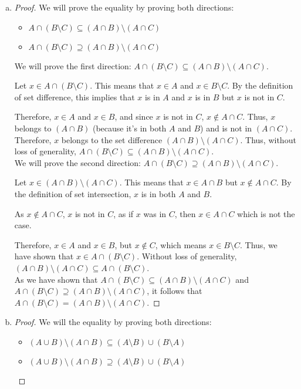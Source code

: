 \documentclass[11pt]{scrartcl}
\theoremstyle{dotlessP}
\theoremstyle{dotlessN}
\newcommand{\unite}{\cup}
\newcommand{\inter}{\cap}
\newcommand{\smin}{\setminus}
\begin{document}
\begin{enumerate}[a)]
	\item 
		\begin{proof}
			We will prove the equality by proving both directions:
			\begin{itemize}
				\item  $A \inter (B \setminus C) \subseteq (A \inter B) \setminus (A \inter C)$
				\item $A \inter (B \setminus C) \supseteq (A \inter B) \setminus (A \inter C)$
			\end{itemize}

			We will prove the first direction: $A \inter (B \setminus C) \subseteq (A \inter B) \setminus (A \inter C)$.

			Let $x \in A \cap (B \setminus C)$. This means that $x \in A$ and $x \in B \setminus C$. By the definition of set difference, this implies that $x$ is in $A$ and $x$ is in $B$ but $x$ is not in $C$.

Therefore, $x \in A$ and $x \in B$, and since $x$ is not in $C$, $x \notin A \cap C$. Thus, $x$ belongs to $(A \cap B)$ (because it's in both $A$ and $B$) and is not in $(A \cap C)$. Therefore, $x$ belongs to the set difference $(A \cap B) \setminus (A \cap C)$. Thus, without loss of generality, $A \inter (B \smin C) \subseteq (A \inter B) \smin (A \inter C)$.
\\

We will prove the second direction: $A \inter (B \setminus C) \supseteq (A \inter B) \setminus (A \inter C)$.

Let $x \in (A \cap B) \setminus (A \cap C)$. This means that $x \in A \cap B$ but $x \not\in A \cap C$. By the definition of set intersection, $x$ is in both $A$ and $B$.

As $x \not\in A \inter C$, $x$ is not in $C$, as if $x$ was in $C$, then $x \in A \inter C$ which is not the case. 

Therefore, $x \in A$ and $x \in B$, but $x \not\in C$, which means $x \in B \setminus C$. Thus, we have shown that $x \in A \cap (B \setminus C)$. Without loss of generality, $(A \inter B) \smin (A \inter C) \subseteq A \inter (B \smin C)$.
\\

As we have shown that $A \inter (B \setminus C) \subseteq (A \inter B) \setminus (A \inter C)$ and $A \inter (B \setminus C) \supseteq (A \inter B) \setminus (A \inter C)$, it follows that $A \inter (B \setminus C) = (A \inter B) \setminus (A \inter C)$.
\end{proof}
\item 
	\begin{proof}
		We will the equality by proving both directions:	
		\begin{itemize}
			\item $(A \unite B) \smin (A \inter B) \subseteq (A \smin B) \unite (B \smin A)$
			\item $(A \unite B) \smin (A \inter B) \supseteq (A \smin B) \unite (B \smin A)$
		\end{itemize}


\end{proof}
\end{enumerate}
\end{document}
